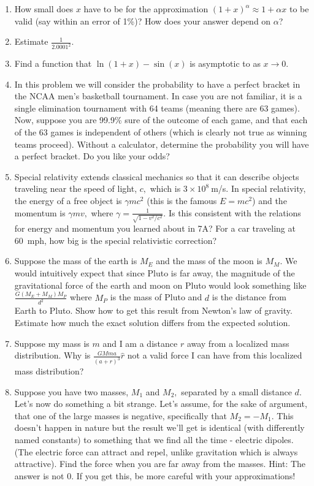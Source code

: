 \documentclass[12pt]{book}
\begin{document}
\begin{enumerate}
 \item How small does $x$ have to be for the approximation $(1+x)^\alpha\approx 1+\alpha x$ to be valid (say within an error of 1\%)? How does your answer depend on $\alpha$?
 \item Estimate $\frac{1}{2.0001^2}.$
 \item Find a function that $\ln(1+x)-\sin(x)$ is asymptotic to as $x\to 0.$ 
 \item In this problem we will consider the probability to have a perfect bracket in the NCAA men's basketball tournament. In case you are not familiar, it is a single elimination tournament with 64 teams (meaning there are 63 games). Now, suppose you are 99.9\% sure of the outcome of each game, and that each of the 63 games is independent of others (which is clearly not true as winning teams proceed). Without a calculator, determine the probability you will have a perfect bracket. Do you like your odds?
 \item Special relativity extends classical mechanics so that it can describe objects traveling near the speed of light, $c,$ which is $3\times10^8~$m/s. In special relativity, the energy of a free object is $\gamma mc^2$ (this is the famous $E=mc^2$) and the momentum is $\gamma m v,$ where $\gamma = \frac{1}{\sqrt{1-v^2/c^2}}.$ Is this consistent with the relations for energy and momentum you learned about in 7A? For a car traveling at 60~mph, how big is the special relativistic correction? 
 \item Suppose the mass of the earth is $M_E$ and the mass of the moon is $M_M.$ We would intuitively expect that since Pluto is far away, the magnitude of the gravitational force of the earth and moon on Pluto would look something like $\frac{G(M_E+M_M)M_P}{d^2}$ where $M_P$ is the mass of Pluto and $d$ is the distance from Earth to Pluto. Show how to get this result from Newton's law of gravity. Estimate how much the exact solution differs from the expected solution.
 \item Suppose my mass is $m$ and I am a distance $r$ away from a localized mass distribution. Why is $\frac{G M m a}{(a+r)^3}\hat{r}$ not a valid force I can have from this localized mass distribution?
 \item Suppose you have two masses, $M_1$ and $M_2,$ separated by a small distance $d.$ Let’s now do something a bit strange. Let’s assume, for the sake of argument, that one of the large masses is negative, specifically that $M_2 = -M_1.$ This doesn’t happen in nature but the result we’ll get is identical (with differently named constants) to something that we find all the time - electric dipoles. (The electric force can attract and repel,
unlike gravitation which is always attractive). Find the force when you are far away from the masses. Hint: The answer is not 0. If you get this, be more careful with your approximations!

\end{enumerate}
\end{document}
